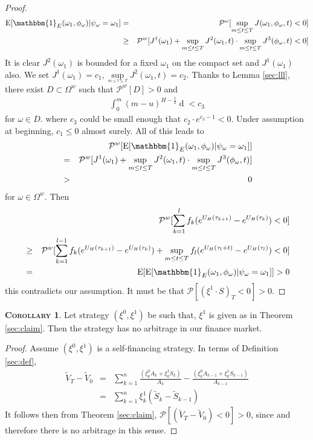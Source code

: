 \documentclass[a4paper, twoside, 11pt]{article}
\theoremstyle{definition}
\newtheorem{corollary}[definition]{\scshape Corollary}
\begin{document}
\begin{proof}
\begin{eqnarray*}
  \mathrm{E} [\mathbbm{1}_{E}(\omega_1, \phi_{\omega})| \psi_{\omega}=\omega_1] &=& \mathcal{P^{\omega}}[\sup\limits_{m\le t \le T} J(\omega_1, \phi_{\omega}, t) < 0] \\
  &\ge& \mathcal{P}^w[J^1(\omega_1) + \sup\limits_{m\le t \le T}J^2(\omega_1, t) \cdot \sup\limits_{m\le t \le T}J^3(\phi_{\omega}, t) < 0]
\end{eqnarray*}
It is clear $J^2(\omega_1)$ is bounded for a fixed $\omega_1$ on the compact set and $J^1(\omega_1)$ also. We set $J^1(\omega_1) = c_1 , \sup\limits_{_{m\le t \le T}}J^2(\omega_1, t) = c_2$. Thanks to Lemma \ref{sec:lll}, there exist $D \subset \Omega^{w} $  such that $\mathcal{P}^{w}[D] >0$ and 
\begin{eqnarray*}
  \int_0^{m}(m-u)^{H-\frac{1}{2}}\mathop{d \phi_{\omega}(u)} < c_3 
\end{eqnarray*}
for $\omega \in D$.
where $c_3$ could be small enough that $c_2 \cdot e^{c_3 - 1} < 0 $. Under assumption at beginning, $c_1 \le 0$ almost surely. All of this leads to 
\begin{eqnarray*}
  &&\mathcal{P}^w[ \mathrm{E} [\mathbbm{1}_{E}(\omega_1, \phi_{\omega})| \psi_{\omega}=\omega_1]]\\ 
  &=& \mathcal{P}^w[J^1(\omega_1) + \sup\limits_{m\le t \le T}J^2(\omega_1, t) \cdot \sup\limits_{m\le t \le T}J^3(\phi_{\omega}, t)]\\
  &>& 0
\end{eqnarray*}
for $\omega \in \Omega^w$.
Then
\begin{eqnarray*}
  &&\mathcal{P}^w[\sum_{k=1}^{l} f_k (e^{U_H(\tau_{k+1})} - e^{U_H(\tau_k)}) < 0] \\
&\ge&\mathcal{P}^w[\sum_{k=1}^{l-1} f_k (e^{U_H(\tau_{k+1})}  - e^{U_H(\tau_{k})}) +  \sup\limits_{m\le t \le T}f_l(e^{U_H(\tau_l+t)}-e^{U_H(\tau_l)})  < 0]\\
&=& \mathrm{E}[ \mathrm{E} [\mathbbm{1}_{E}(\omega_1, \phi_{\omega})| \psi_{\omega}=\omega_1]] > 0
\end{eqnarray*}
this contradicts our assumption. It must be that ${\mathcal{P}}[(\xi^1 \cdot S)_T < 0] > 0$.
\end{proof}

\begin{corollary}
  Let strategy $(\xi^0, \xi^1)$ be such that, $\xi^1$ is given as in Theorem \ref{sec:claim}. Then the strategy has no arbitrage in our finance market.
\end{corollary}
\begin{proof}
  Assume $(\xi^0, \xi^1)$ is a self-financing strategy. In terms of Definition \ref{sec:def},
\begin{eqnarray*}
  \tilde{V}_T - \tilde{V}_0 &=&  \sum_{k=1} ^ n \frac{(\xi^0_kA_k + \xi^1_kS_k)}{A_k} - \frac{(\xi^0_{k}A_{k-1} + \xi^1_{k}S_{k-1})}{A_{k-1}}\\
  &=&  \sum_{k=1}^{n} \xi^1_k (\tilde{S}_k - \tilde{S}_{k-1})
\end{eqnarray*}
It follows then from Theorem \ref{sec:claim}, $\mathcal{P}[(\tilde{V}_T - \tilde{V}_0) < 0] > 0$, since and therefore there is no arbitrage in this sense.
\end{proof}
\end{document}
